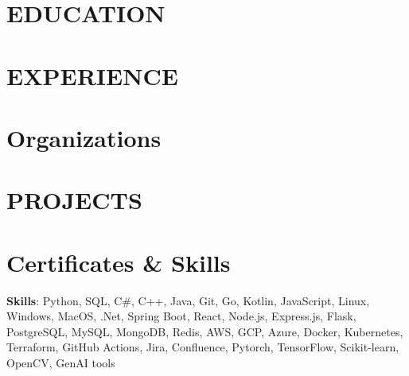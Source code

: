 \documentclass[10pt, letterpaper]{article}
\begin{document}
    \newcommand{\AND}{\unskip
        \cleaders\copy\ANDbox\hskip\wd\ANDbox
        \ignorespaces
    }
    \newsavebox\ANDbox
    \sbox\ANDbox{$|$}
    
    \begin{header}
        \normalsize
    \end{header}

    \vspace{5 pt - 0.3 cm}

\section{EDUCATION}

\vspace{0.2 cm}
\section{EXPERIENCE}

\vspace{0.1 cm}

\vspace{0.1 cm}

\vspace{0.1 cm}

\vspace{0.2 cm}
\section{Organizations}


\vspace{0.2 cm}
\section{PROJECTS}

\vspace{0.2 cm}
\section{Certificates \& Skills}

\textbf{Skills}: Python, SQL, C\#, C++, Java, Git, Go, Kotlin, JavaScript,
Linux, Windows, MacOS,
.Net, Spring Boot, React, Node.js, Express.js, Flask,
PostgreSQL, MySQL, MongoDB, Redis,
AWS, GCP, Azure, Docker, Kubernetes, Terraform, GitHub Actions,
Jira, Confluence, 
Pytorch, TensorFlow, Scikit-learn, OpenCV, GenAI tools
\end{document}
